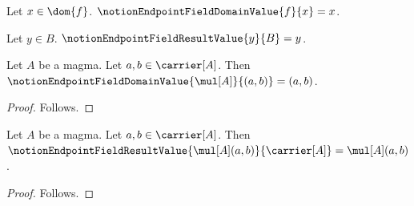 

\begin{definition}\label{notion_endpoint_field_domain_value}
    Let $x\in\dom{f}$.
    $\notionEndpointFieldDomainValue{f}{x}=x$.
\end{definition}

\begin{definition}\label{notion_endpoint_field_result_value}
    Let $y\in B$.
    $\notionEndpointFieldResultValue{y}{B}=y$.
\end{definition}

\begin{proposition}\label{notion_endpoint_field_domain}
    Let $A$ be a magma.
    Let $a,b\in\carrier[A]$.
    Then $\notionEndpointFieldDomainValue{\mul[A]}{(a,b)}=(a,b)$.
\end{proposition}
\begin{proof}
    Follows.
\end{proof}

\begin{proposition}\label{notion_endpoint_field_result}
    Let $A$ be a magma.
    Let $a,b\in\carrier[A]$.
    Then $\notionEndpointFieldResultValue
        {\mul[A](a,b)}{\carrier[A]}=\mul[A](a,b)$.
\end{proposition}
\begin{proof}
    Follows.
\end{proof}
